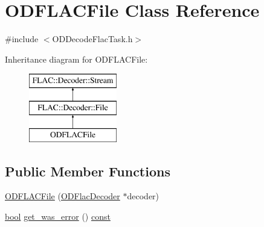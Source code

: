 \hypertarget{class_o_d_f_l_a_c_file}{}\section{O\+D\+F\+L\+A\+C\+File Class Reference}
\label{class_o_d_f_l_a_c_file}


{\ttfamily \#include $<$O\+D\+Decode\+Flac\+Task.\+h$>$}

Inheritance diagram for O\+D\+F\+L\+A\+C\+File\+:\begin{figure}[H]
\begin{center}
\leavevmode
\includegraphics[height=3.000000cm]{class_o_d_f_l_a_c_file}
\end{center}
\end{figure}
\subsection*{Public Member Functions}
\begin{DoxyCompactItemize}
\item 
\hyperlink{class_o_d_f_l_a_c_file_a28b79defdd320d76bb80141de3d15155}{O\+D\+F\+L\+A\+C\+File} (\hyperlink{class_o_d_flac_decoder}{O\+D\+Flac\+Decoder} $\ast$decoder)
\item 
\hyperlink{mac_2config_2i386_2lib-src_2libsoxr_2soxr-config_8h_abb452686968e48b67397da5f97445f5b}{bool} \hyperlink{class_o_d_f_l_a_c_file_a76c67fd277264cc56d9b09703365aac2}{get\+\_\+was\+\_\+error} () \hyperlink{getopt1_8c_a2c212835823e3c54a8ab6d95c652660e}{const} 
\end{DoxyCompactItemize}
